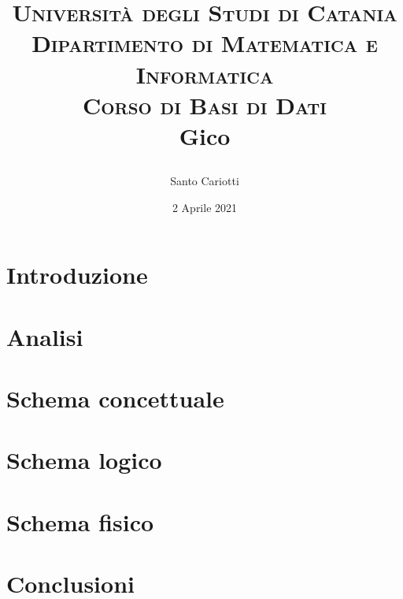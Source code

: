 		

\title{
    \small\textsc{Università degli Studi di Catania\\Dipartimento di Matematica e Informatica\\Corso di Basi di Dati}\\
    \Huge\textbf{Gico}\\
    \author{Santo Cariotti}
    \date{2 Aprile 2021}
}

\usepackage{graphicx}

\maketitle

\renewcommand{\contentsname}{Indice}
\tableofcontents{}


\chapter{Introduzione}


\chapter{Analisi}


\chapter{Schema concettuale}


\chapter{Schema logico}


\chapter{Schema fisico}


\chapter{Conclusioni}



